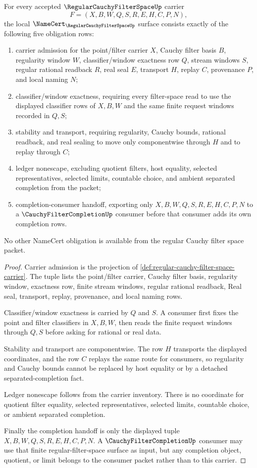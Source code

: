 \begin{theorem}
\label{thm:regular-cauchy-filter-space-namecert-obligations}
For every accepted $\RegularCauchyFilterSpaceUp$ carrier
$$
F=(X,B,W,Q,S,R,E,H,C,P,N),
$$
the local $\NameCert_{\RegularCauchyFilterSpaceUp}$ surface consists exactly of the following five obligation rows:
\begin{enumerate}
\item carrier admission for the point/filter carrier $X$, Cauchy filter basis $B$, regularity window $W$, classifier/window exactness row $Q$, stream windows $S$, regular rational readback $R$, real seal $E$, transport $H$, replay $C$, provenance $P$, and local naming $N$;
\item classifier/window exactness, requiring every filter-space read to use the displayed classifier rows of $X,B,W$ and the same finite request windows recorded in $Q,S$;
\item stability and transport, requiring regularity, Cauchy bounds, rational readback, and real sealing to move only componentwise through $H$ and to replay through $C$;
\item ledger nonescape, excluding quotient filters, host equality, selected representatives, selected limits, countable choice, and ambient separated completion from the packet;
\item completion-consumer handoff, exporting only $X,B,W,Q,S,R,E,H,C,P,N$ to a $\CauchyFilterCompletionUp$ consumer before that consumer adds its own completion rows.
\end{enumerate}
No other NameCert obligation is available from the regular Cauchy filter space packet.
\end{theorem}
\begin{proof}
Carrier admission is the projection of \autoref{def:regular-cauchy-filter-space-carrier}. The tuple lists the point/filter carrier, Cauchy filter basis, regularity window, exactness row, finite stream windows, regular rational readback, Real seal, transport, replay, provenance, and local naming rows.

Classifier/window exactness is carried by $Q$ and $S$. A consumer first fixes the point and filter classifiers in $X,B,W$, then reads the finite request windows through $Q,S$ before asking for rational or real data.

Stability and transport are componentwise. The row $H$ transports the displayed coordinates, and the row $C$ replays the same route for consumers, so regularity and Cauchy bounds cannot be replaced by host equality or by a detached separated-completion fact.

Ledger nonescape follows from the carrier inventory. There is no coordinate for quotient filter equality, selected representatives, selected limits, countable choice, or ambient separated completion.

Finally the completion handoff is only the displayed tuple $X,B,W,Q,S,R,E,H,C,P,N$. A $\CauchyFilterCompletionUp$ consumer may use that finite regular-filter-space surface as input, but any completion object, quotient, or limit belongs to the consumer packet rather than to this carrier.
\end{proof}

